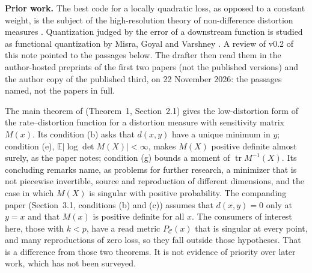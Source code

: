 \documentclass[11pt,onecolumn]{IEEEtran}
\newcommand{\E}{\mathbb{E}}
\newcommand{\tr}{\operatorname{tr}}
\newcommand{\PC}{P_{\mathcal C}}
\begin{document}
\textbf{Prior work.} The best code for a locally quadratic loss, as opposed to a constant
weight, is the subject of the high-resolution theory of non-difference distortion
measures \cite{linderzamir,linderzamirzeger}. Quantization judged by the error of a
downstream function is studied as functional quantization by Misra, Goyal and Varshney
\cite{misra}. A review of v0.2 of this note pointed to the passages below. The drafter
then read them in the author-hosted preprints of the first two papers (not the published
versions) and the author copy of the published third, on 22 November 2026: the passages named, not the papers in full.

The main theorem of \cite{linderzamir} (Theorem~1, Section~2.1) gives the low-distortion
form of the rate--distortion function for a distortion measure with sensitivity matrix
$M(x)$. Its condition (b) asks that $d(x,y)$ have a unique minimum in $y$; condition (e),
$\E|\log\det M(X)|<\infty$, makes $M(X)$ positive definite almost surely, as the paper
notes; condition (g) bounds a moment of $\tr M^{-1}(X)$. Its concluding remarks name, as
problems for further research, a minimizer that is not piecewise invertible, source and
reproduction of different dimensions, and the case in which $M(X)$ is singular with
positive probability. The companding paper \cite{linderzamirzeger} (Section~3.1,
conditions (b) and (c)) assumes that $d(x,y)=0$ only at $y=x$ and that $M(x)$ is positive
definite for all $x$. The consumers of interest here, those with $k<p$, have a read metric $\PC(x)$ that is
singular at every point, and many reproductions of zero loss, so they fall outside those
hypotheses. That is a difference from those two theorems. It is not evidence of priority
over later work, which has not been surveyed.
\end{document}
